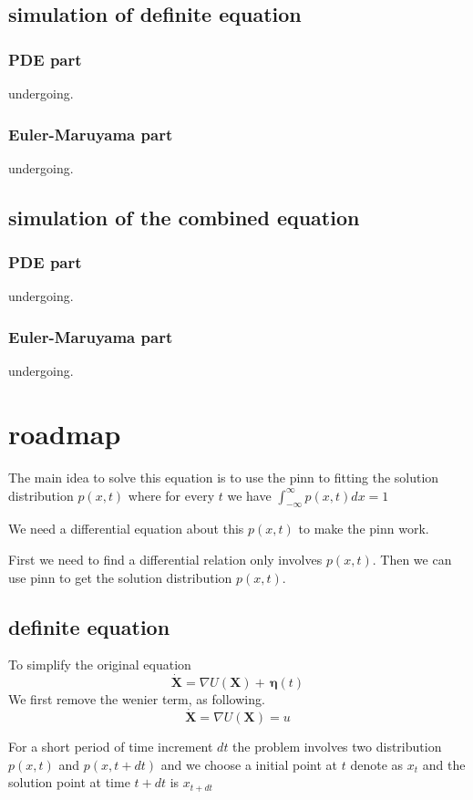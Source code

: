 \documentclass{article}
\theoremstyle{definition} %
\begin{document}
\subsection{simulation of definite equation}
\subsubsection{PDE part}
undergoing.
\subsubsection{Euler-Maruyama part}
undergoing.
\subsection{simulation of the combined equation}
\subsubsection{PDE part}
undergoing.
\subsubsection{Euler-Maruyama part}
undergoing.

\section{roadmap}
The main idea to solve this equation is
to use the pinn\cite{raissi2017physics} to fitting the solution
distribution \(p(x,t)\)
where for every \(t\) we have
\(\int_{-\infty}^{\infty}p(x,t)dx=1\)

We need a differential equation about this
\(p(x,t)\) to make the pinn work.

First we need to find a differential
relation only involves \(p(x,t)\).
Then we can use pinn to get the solution
distribution \(p(x,t)\).

\subsection{definite equation}
To simplify the original equation
\[
    \dot{\mathbf{X}} =  \nabla U(\mathbf{X}) +  \,\boldsymbol{\eta}(t)
\]
We first remove the wenier term,
as following.
\[
    \dot{\mathbf{X}} =  \nabla U(\mathbf{X})=u
\]

For a short period of time increment \(dt\)
the problem involves two distribution
\(p(x,t)\) and \(p(x,t+dt)\)
and we choose a initial point at \(t\)
denote as \(x_t\) and the solution point
at time \(t+dt\) is \(x_{t+dt}\)
\end{document}
